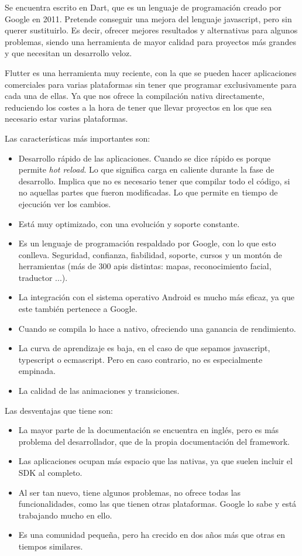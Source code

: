 Se encuentra escrito en Dart, que es un lenguaje de programación creado por Google en 2011. Pretende conseguir una mejora del lenguaje javascript, pero sin querer sustituirlo. Es decir, ofrecer mejores resultados y alternativas para algunos problemas, siendo una herramienta de mayor calidad para proyectos más grandes y que necesitan un desarrollo veloz.

Flutter es una herramienta muy reciente, con la que se pueden hacer aplicaciones comerciales para varias plataformas sin tener que programar exclusivamente para cada una de ellas. Ya que nos ofrece la compilación nativa directamente, reduciendo los costes a la hora de tener que llevar proyectos en los que sea necesario estar varias plataformas.

Las características más importantes son: 

\begin{itemize}
	\item Desarrollo rápido de las aplicaciones. Cuando se dice rápido es porque permite \emph{hot reload}. Lo que significa carga en caliente durante la fase de desarrollo. Implica que no es necesario tener que compilar todo el código, si no aquellas partes que fueron modificadas. Lo que permite en tiempo de ejecución ver los cambios.
	\item Está muy optimizado, con una evolución y soporte constante.
	\item Es un lenguaje de programación respaldado por Google, con lo que esto conlleva. Seguridad, confianza, fiabilidad, soporte, cursos y un montón de herramientas (más de 300 apis distintas: mapas, reconocimiento facial, traductor ...).
	\item La integración con el sistema operativo Android es mucho más eficaz, ya que este también pertenece a Google.
	\item Cuando se compila lo hace a nativo, ofreciendo una ganancia de rendimiento.
	\item La curva de aprendizaje es baja, en el caso de que sepamos javascript, typescript o ecmascript. Pero en caso contrario, no es especialmente empinada.
	\item La calidad de las animaciones y transiciones.
\end{itemize}

Las desventajas que tiene son:
\begin{itemize}
	\item La mayor parte de la documentación se encuentra en inglés, pero es más problema del desarrollador, que de la propia documentación del framework.
	\item Las aplicaciones ocupan más espacio que las nativas, ya que suelen incluir el SDK al completo.
	\item Al ser tan nuevo, tiene algunos problemas, no ofrece todas las funcionalidades, como las que tienen otras plataformas. Google lo sabe y está trabajando mucho en ello.
	\item Es una comunidad pequeña, pero ha crecido en dos años más que otras en tiempos similares.
\end{itemize}

